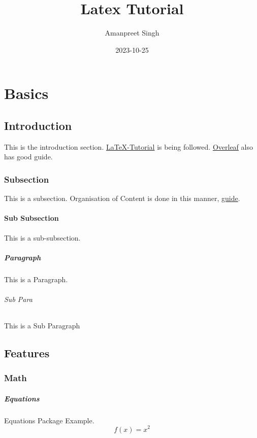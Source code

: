 \documentclass{report}[a4paper,12pt] %
\title{Latex Tutorial}
\date{2023-10-25}
\author{Amanpreet Singh}
\begin{document}
  \maketitle %
  \tableofcontents
  \newpage %

\chapter{Basics} %
\section{Introduction}
This is the introduction section.
\href{http://www.latex-tutorial.com}{LaTeX-Tutorial} is being followed.
\href{https://www.overleaf.com/learn}{Overleaf} also has good guide.


\subsection{Subsection}
This is a subsection.  
Organisation of Content is done in this manner, \href{https://www.overleaf.com/learn/latex/Sections_and_chapters}{guide}.

\subsubsection{Sub Subsection}
This is a sub-subsection.

\paragraph{Paragraph} 
This is a Paragraph.

\subparagraph{Sub Para}
This is a Sub Paragraph

\section{Features}

\subsection{Math}

\paragraph{Equations}
Equations Package Example.
\begin{equation}
  f(x) = x^2
\end{equation}
\end{document}
